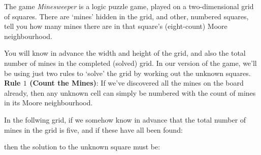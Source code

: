 
The game {\it Minesweeper}
is a logic puzzle game, played on a two-dimensional
grid of squares. There are `mines' hidden in the grid, and other, numbered squares,
tell you how many mines there are in that square's (eight-count) Moore neighbourhood.

You will know in advance the width and height of the grid, and also the
total number of mines in the completed (solved) grid.  In our version of
the game, we'll be using just two rules to `solve' the grid by working
out the unknown squares.
\\[1em]
{\bf Rule $1$ (Count the Mines)}: If we've discovered all the mines on the board already, then any unknown cell
can simply be numbered with the count of mines in its Moore neighbourhood.

In the follwing grid,
if we somehow know in advance that the total number of mines in the grid is five, and if these have all been found:\\
\begin{center}
\end{center}

\noindent then the solution to the unknown square must be:\\
\begin{center}
\end{center}

